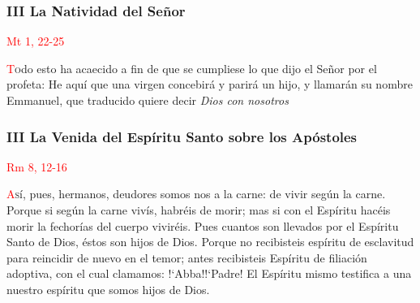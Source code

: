 \documentclass[10pt,twoside]{book}
\begin{document}
\begin{paracol}{2}
\begin{rightcolumn}
            
      \end{rightcolumn}


      \begin{leftcolumn*}
            \begin{center}
                  \subsubsection*{III La Natividad del Señor}
                  \textcolor{red}{Mt 1, 22-25}
            \end{center}

            \lettrine[lines=2]{\textcolor{red}{T}}odo esto ha acaecido a fin de que se cumpliese lo que dijo el Señor por el profeta: He aquí que una virgen concebirá y parirá
            un hijo, y llamarán su nombre Emmanuel, que traducido quiere decir \textit{Dios con nosotros}

            
      \end{leftcolumn*}

      \begin{rightcolumn}
            \begin{center}
                  \subsubsection*{III La Venida del Espíritu Santo sobre los Apóstoles}
                  \textcolor{red}{Rm 8, 12-16}
            \end{center}

            \lettrine[lines=2]{\textcolor{red}{A}}sí, pues, hermanos, deudores somos nos a la carne: de vivir según la carne. Porque si según la carne vivís, habréis de morir; mas
            si con el Espíritu hacéis morir la fechorías del cuerpo viviréis. Pues cuantos son llevados por el Espíritu Santo de Dios, éstos son hijos de Dios. Porque no recibisteis
            espíritu de esclavitud para reincidir de nuevo en el temor; antes recibisteis Espíritu de filiación adoptiva, con el cual clamamos: {!`}Abba!{!`}Padre! El Espíritu mismo
            testifica a una nuestro espíritu que somos hijos de Dios.

            
      \end{rightcolumn}


\end{paracol}
\end{document}
